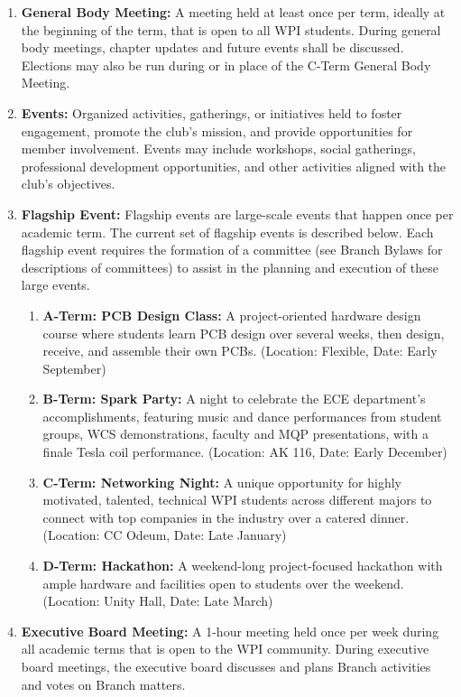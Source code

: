 \documentclass[11pt]{article}
\begin{document}
\begin{enumerate}
    \item \textbf{General Body Meeting:} A meeting held at least once per term, ideally at the beginning of the term, that is open to all WPI students. During general body meetings, chapter updates and future events shall be discussed. Elections may also be run during or in place of the C-Term General Body Meeting.

    \item \textbf{Events:} Organized activities, gatherings, or initiatives held to foster engagement, promote the club's mission, and provide opportunities for member involvement. Events may include workshops, social gatherings, professional development opportunities, and other activities aligned with the club's objectives.

    \item \textbf{Flagship Event:} Flagship events are large-scale events that happen once per academic term. The current set of flagship events is described below. Each flagship event requires the formation of a committee (see Branch Bylaws for descriptions of committees) to assist in the planning and execution of these large events.
    \begin{enumerate}
        \item \textbf{A-Term: PCB Design Class:} A project-oriented hardware design course where students learn PCB design over several weeks, then design, receive, and assemble their own PCBs. (Location: Flexible, Date: Early September)
        \item \textbf{B-Term: Spark Party:} A night to celebrate the ECE department's accomplishments, featuring music and dance performances from student groups, WCS demonstrations, faculty and MQP presentations, with a finale Tesla coil performance. (Location: AK 116, Date: Early December)
        \item \textbf{C-Term: Networking Night:} A unique opportunity for highly motivated, talented, technical WPI students across different majors to connect with top companies in the industry over a catered dinner. (Location: CC Odeum, Date: Late January)
        \item \textbf{D-Term: Hackathon:} A weekend-long project-focused hackathon with ample hardware and facilities open to students over the weekend. (Location: Unity Hall, Date: Late March)
    \end{enumerate}

    \item \textbf{Executive Board Meeting:} A 1-hour meeting held once per week during all academic terms that is open to the WPI community. During executive board meetings, the executive board discusses and plans Branch activities and votes on Branch matters.
\end{enumerate}
\end{document}
